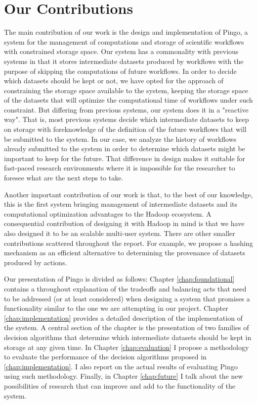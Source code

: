 \section{Our Contributions}
The main contribution of our work is the design and implementation of Pingo, a system for the management of computations and storage of scientific workflows with constrained storage space. Our system has a commonality with previous systems in that it stores intermediate datasets produced by workflows with the purpose of skipping the computations of future workflows.  In order to decide which datasets should be kept or not, we have opted for the approach of constraining the storage space available to the system, keeping the storage space of the datasets that will optimize the computational time of workflows under such constraint. But differing from previous systems, our system does it in a "reactive way".  That is, most previous systems decide which intermediate datasets to keep on storage with foreknowledge of the definition of the future workflows that will be submitted to the system.  In our case, we analyze the history of workflows already submitted to the system in order to determine which datasets might be important to keep for the future. That difference in design makes it suitable for fast-paced research environments where it is impossible for the researcher to foresee what are the next steps to take.

Another important contribution of our work is that, to the best of our knowledge, this is the first system bringing management of intermediate datasets and its computational optimization advantages to the Hadoop ecosystem.  A consequential contribution of designing it with Hadoop in mind is that we have also designed it to be an scalable multi-user system.  There are other smaller contributions scattered throughout the report. For example, we propose a hashing mechanism as an efficient alternative to determining the provenance of datasets produced by actions.  

Our presentation of Pingo is divided as follows: Chapter \ref{chap:foundational} contains a throughout explanation of the tradeoffs and balancing acts that need to be addressed (or at least considered) when designing a system that promises a functionality similar to the one we are attempting in our project. Chapter \ref{chap:implementation} provides a detailed description of the implementation of the system.  A central section of the chapter is the presentation of two families of decision algorithms that determine which intermediate datasets should be kept in storage at any given time. In Chapter \ref{chap:evaluation} I propose a methodology to evaluate the performance of the decision algorithms proposed in \ref{chap:implementation}.  I also report on the actual results of evaluating Pingo using such methodology.  Finally, in Chapter \ref{chap:future} I talk about the new possibilities of research that can improve and add to the functionality of the system.